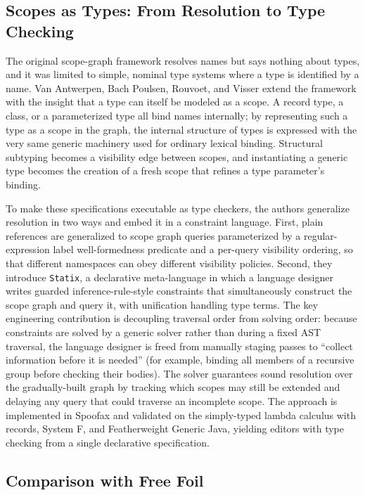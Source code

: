 \subsection{Scopes as Types: From Resolution to Type Checking}
\label{subsec:scopes-as-types}

The original scope-graph framework resolves names but says nothing about types, and it was limited to simple, nominal type systems where a type is identified by a name. 
Van Antwerpen, Bach Poulsen, Rouvoet, and Visser \cite{scopesAsTypes2018} extend the framework with the insight that a type can itself be modeled as a scope. 
A record type, a class, or a parameterized type all bind names internally; by representing such a type as a scope in the graph, the internal structure of types is expressed with the very same generic machinery used for ordinary lexical binding. 
Structural subtyping becomes a visibility edge between scopes, and instantiating a generic type becomes the creation of a fresh scope that refines a type parameter's binding.

To make these specifications executable as type checkers, the authors generalize resolution in two ways and embed it in a constraint language. 
First, plain references are generalized to scope graph queries parameterized by a regular-expression label well-formedness predicate and a per-query visibility ordering, so that different namespaces can obey different visibility policies. 
Second, they introduce \texttt{Statix}, a declarative meta-language in which a language designer writes guarded inference-rule-style constraints that simultaneously construct the scope graph and query it, with unification handling type terms. 
The key engineering contribution is decoupling traversal order from solving order: because constraints are solved by a generic solver rather than during a fixed AST traversal, the language designer is freed from manually staging passes to ``collect information before it is needed'' (for example, binding all members of a recursive group before checking their bodies). 
The solver guarantees sound resolution over the gradually-built graph by tracking which scopes may still be extended and delaying any query that could traverse an incomplete scope. 
The approach is implemented in Spoofax and validated on the simply-typed lambda calculus with records, System F, and Featherweight Generic Java, yielding editors with type checking from a single declarative specification.

\subsection{Comparison with Free Foil}
\label{subsec:scope-graphs-vs-free-foil}

